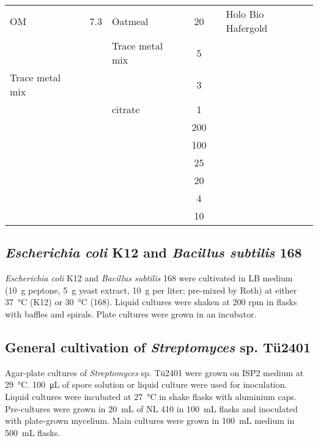 \begin{table}[htbp]
\begin{tabularx}{\textwidth}{XSXS[table-format=3.0]@{\,}s[table-unit-alignment = left]X}
			\midrule
			OM 		& 7.3		& Oatmeal				& 20	& \gram	&	Holo Bio Hafergold	\\
					&			& Trace metal mix		& 5		& \milli\liter	&\\
			\midrule
			Trace metal mix &	& 	& 3		& \gram	&		\\
			 		&			&  citrate	& 1		& \gram	&		\\
			 		&			& 		& 200	& \milli\gram	&\\
			 		&			& 			& 100	& \milli\gram	&\\
			 		&			& 	& 25	& \milli\gram	&\\
			 		&			& 	& 20	& \milli\gram	&\\
			 		&			& 	& 4		& \milli\gram	&\\
			 		&			& 	& 10	& \milli\gram	&\\
			\bottomrule
		\end{tabularx}
	\end{table}


	\subsection{\emph{Escherichia coli} K12 and \emph{Bacillus subtilis} 168} %
	\label{sub:escherichia_coli_k12}
		\emph{Escherichia coli} K12 and \emph{Bacillus subtilis} 168 were cultivated in LB medium (\SI{10}{\gram} peptone, \SI{5}{\gram} yeast extract, \SI{10}{\gram}  per liter; pre-mixed by Roth) at either \SI{37}{\celsius} (K12) or \SI{30}{\celsius} (168). Liquid cultures were shaken at 200 rpm in flasks with baffles and spirals. Plate cultures were grown in an incubator.

	\subsection{General cultivation of \emph{Streptomyces} sp. Tü2401} %
	\label{sub:streptomyces_sp_t}
		Agar-plate cultures of \textit{Streptomyces} sp. Tü2401 were grown on ISP2 medium at \SI{29}{\celsius}. \SI{100}{\micro\liter} of spore solution or liquid culture were used for inoculation. Liquid cultures were incubated at \SI{27}{\celsius} in shake flasks with aluminium caps. Pre-cultures were grown in \SI{20}{\milli\liter} of NL 410 in \SI{100}{\milli\liter} flasks and inoculated with plate-grown mycelium. Main cultures were grown in \SI{100}{\milli\liter} medium in \SI{500}{\milli\liter} flasks.

